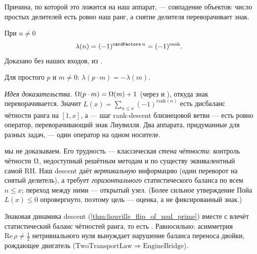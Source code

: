 Причина, по которой это ложится на наш аппарат, --- совпадение объектов: число простых делителей есть
ровно наш ранг, а снятие делителя переворачивает знак.

\begin{theorem}\label{thm:liouville_eq_neg_one_pow_rank}
При $n\ne0$
\begin{equation}\label{eq:liouville-rank}
  \lambda(n) = (-1)^{\texttt{cardFactors}\,n} = (-1)^{\mathrm{rank}} .
\end{equation}
Доказано без наших входов, из . \green{}
\end{theorem}

\begin{theorem}\label{thm:liouville_flip_of_mul_prime}
Для простого $p$ и $m\ne0$: $\lambda(p\cdot m) = -\lambda(m)$. \green{}
\end{theorem}

\emph{Идея доказательства.} $\Omega(p\cdot m) = \Omega(m)+1$ (через  и
), откуда знак переворачивается. Значит
$L(x) = \sum_{n\le x}(-1)^{\mathrm{rank}(n)}$ есть дисбаланс чётности ранга на $[1,x]$, а
 --- шаг rank-descent близнецовой ветви --- есть ровно оператор, переворачивающий
знак Лиувилля. Два аппарата, придуманные для разных задач, --- один оператор на одном носителе.

 мы не доказываем. Его трудность --- классическая \emph{стена чётности}: контроль
чётности $\Omega$, недоступный решётным методам и по существу эквивалентный самой RH. Наш descent даёт
\emph{вертикальную} информацию (один переворот на снятый делитель), а  требует
\emph{горизонтального} статистического баланса по всем $n\le x$; переход между ними --- открытый узел.
(Более сильное утверждение Пойа $L(x)\le0$ опровергнуто, поэтому цель --- оценка, а не фиксированный
знак.)

\begin{conjecture}\label{conj:rank-balance}
Знаковая динамика descent (\cref{thm:liouville_flip_of_mul_prime}) вместе с
 влечёт статистический баланс чётностей ранга, то есть
. Равносильно: асимметрия $\mathrm{Re}\,\rho \ne \tfrac12$ нетривиального нуля
вынуждает нарушение баланса переноса двойки, рождающее двигатель
($\mathrm{TwoTransportLaw} \Rightarrow \mathrm{EngineBridge}$). \red{}
\end{conjecture}

